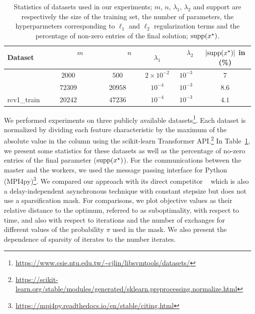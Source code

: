 \begin{table}[b]
\begin{center}
\begin{tabular}{lccccc}
\hline 
Dataset              & ~~~~~~$m$~~~~~~ & ~~~~~~$n$~~~~~~ & ~~$\lambda_1$~~ & ~~$\lambda_2$~~ & $|\mathrm{supp}(x^\star)|$ in (\%) \\
\hline
\vspace{1mm}{madelon}         &{$2000$} & {$500$} & $2\times10^{-2}$ & $10^{-3}$ & $7$  \\%
\vspace{1mm}{real-sim}    & {$72309$} & {$20958$} & $10^{-4}$ & $10^{-3}$ & $8.6$ \\%
{rcv1\_train}    & {$20242$} & {$47236$} & $10^{-4}$ & $10^{-3}$ & $4.1$ \\%
\hline %
\end{tabular}
\end{center}
\caption{Statistics of datasets used in our experiments; $m$, $n$, $\lambda_1$, $\lambda_2$ and support are respectively the size of the training set, the number of parameters, the hyperparmeters corresponding to $\ell_1$ and $\ell_2$ regularization terms and the percentage of non-zero entries of the final solution; $\mathrm{supp}(x^\star)$.}
\label{tab:datasets}
\end{table}

We performed experiments on three publicly available datasets\footnote{\url{https://www.csie.ntu.edu.tw/~cjlin/libsvmtools/datasets/}}. Each dataset is normalized by dividing each feature characteristic by the maximum of the absolute value in the column using the scikit-learn Transformer API.\footnote{\url{https://scikit-learn.org/stable/modules/generated/sklearn.preprocessing.normalize.html}} In Table~\ref{tab:datasets}, we present some statistics for these datasets as well as the percentage of no-zero entries of the final parameter ($\mathrm{supp}(x^\star)$). 
For the communications between the master and the workers, we used the message passing interface for Python (MPI4py)\footnote{\url{https://mpi4py.readthedocs.io/en/stable/citing.html}}. We compared our approach \SP{} with its direct competitor \dave~\cite{ICML18} which is also a delay-independent asynchronous technique with constant stepsize but does not use a sparsification mask. For comparisons, we plot objective values as their relative distance to the optimum, referred to as suboptimality, with respect to time, and also with respect to iterations and the number of exchanges for different values of the probability $\pi$ used in the mask. We also present the dependence of sparsity of iterates to the number iterates. 


